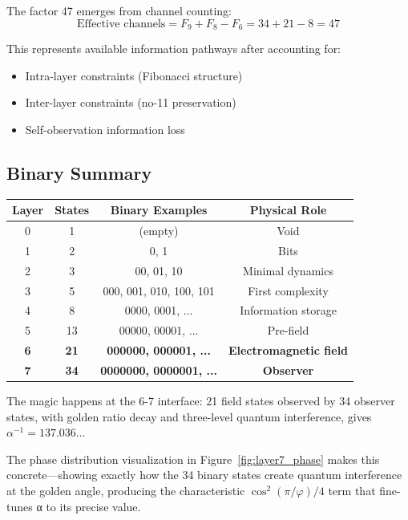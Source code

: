 \documentclass[%
 reprint,
 amsmath,amssymb,
 aps,
 prd,
 10pt,
 nofootinbib,      %
 longbibliography  %
]{revtex4-2}
\theoremstyle{definition}
\theoremstyle{remark}
\begin{document}
The factor 47 emerges from channel counting:
\begin{equation}
\text{Effective channels} = F_9 + F_8 - F_6 = 34 + 21 - 8 = 47
\end{equation}

This represents available information pathways after accounting for:
\begin{itemize}
\item Intra-layer constraints (Fibonacci structure)
\item Inter-layer constraints (no-11 preservation)
\item Self-observation information loss
\end{itemize}

\subsection{Binary Summary}

\begin{center}
\begin{tabular}{|c|c|c|c|}
\hline
Layer & States & Binary Examples & Physical Role \\
\hline
0 & 1 & (empty) & Void \\
1 & 2 & 0, 1 & Bits \\
2 & 3 & 00, 01, 10 & Minimal dynamics \\
3 & 5 & 000, 001, 010, 100, 101 & First complexity \\
4 & 8 & 0000, 0001, ... & Information storage \\
5 & 13 & 00000, 00001, ... & Pre-field \\
\textbf{6} & \textbf{21} & \textbf{000000, 000001, ...} & \textbf{Electromagnetic field} \\
\textbf{7} & \textbf{34} & \textbf{0000000, 0000001, ...} & \textbf{Observer} \\
\hline
\end{tabular}
\end{center}

The magic happens at the 6-7 interface: 21 field states observed by 34 observer states, with golden ratio decay and three-level quantum interference, gives $\alpha^{-1} = 137.036\ldots$

The phase distribution visualization in Figure~\ref{fig:layer7_phase} makes this concrete—showing exactly how the 34 binary states create quantum interference at the golden angle, producing the characteristic $\cos^2(\pi/\varphi)/4$ term that fine-tunes α to its precise value.
\end{document}
